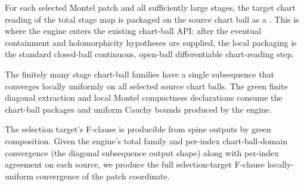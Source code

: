 \begin{lemma}
\label{lem:stage-chart-reading-chartBallPowerSeries}
For each selected Montel patch and all sufficiently large stages, the target
chart reading of the total stage map is packaged on the source chart ball as a
.  This is where the engine enters the existing
chart-ball API: after the eventual containment and holomorphicity hypotheses
are supplied, the local packaging is the standard closed-ball continuous,
open-ball differentiable chart-reading step.
\end{lemma}

\begin{lemma}\leanok
\label{lem:stage-common-diagonal-subsequence}
The finitely many stage chart-ball families have a single subsequence that
converges locally uniformly on all selected source chart balls.  The green
finite diagonal extraction and local Montel compactness declarations consume
the chart-ball packages and uniform Cauchy bounds produced by the engine.
\end{lemma}

\begin{lemma}\leanok
\label{lem:stage-engine-f-clause-transfer}
The selection target's F-clause is producible from spine outputs by green
composition. Given the engine's total family and per-index chart-ball-domain
convergence (the diagonal subsequence output shape) along with per-index
agreement on each source, we produce the full selection-target F-clause
locally-uniform convergence of the patch coordinate.
\end{lemma}

